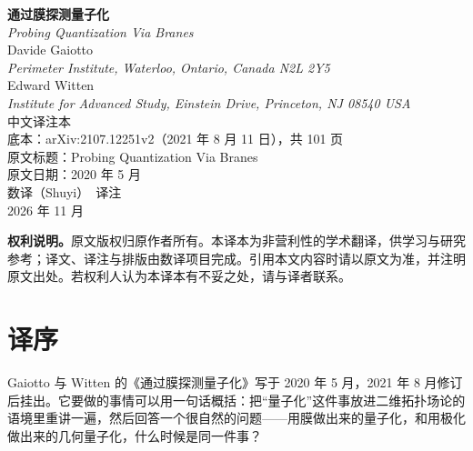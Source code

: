 \begin{titlepage}
\vspace*{1.2cm}
\begin{center}
{\bfseries\LARGE 通过膜探测量子化}\\[0.35cm]
{\large\itshape Probing Quantization Via Branes}\\[1.2cm]
{\large Davide Gaiotto}\\[0.1cm]
{\small\itshape Perimeter Institute, Waterloo, Ontario, Canada N2L 2Y5}\\[0.45cm]
{\large Edward Witten}\\[0.1cm]
{\small\itshape Institute for Advanced Study, Einstein Drive, Princeton, NJ 08540 USA}\\[1.6cm]
{\large 中文译注本}\\[0.5cm]
{\small 底本：arXiv:2107.12251v2（2021 年 8 月 11 日），共 101 页}\\[0.15cm]
{\small 原文标题：Probing Quantization Via Branes}\\[0.15cm]
{\small 原文日期：2020 年 5 月}\\[1.2cm]
{\large 数译（Shuyi）\ 译注}\\[0.4cm]
{\small 2026 年 11 月}
\end{center}
\vfill
\begin{center}
\begin{minipage}{0.86\textwidth}
\small
\textbf{权利说明。}原文版权归原作者所有。本译本为非营利性的学术翻译，供学习与研究参考；译文、译注与排版由数译项目完成。引用本文内容时请以原文为准，并注明原文出处。若权利人认为本译本有不妥之处，请与译者联系。
\end{minipage}
\end{center}
\end{titlepage}

\tableofcontents
\clearpage

\section*{译序}

Gaiotto 与 Witten 的《通过膜探测量子化》写于 2020 年 5 月，2021 年 8 月修订后挂出。它要做的事情可以用一句话概括：把“量子化”这件事放进二维拓扑场论的语境里重讲一遍，然后回答一个很自然的问题——用膜做出来的量子化，和用极化做出来的几何量子化，什么时候是同一件事？


